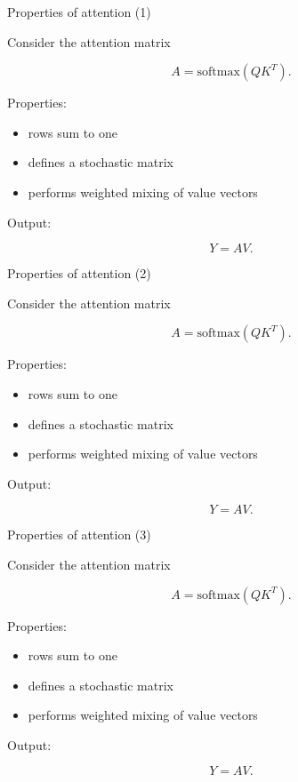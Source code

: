 \documentclass[aspectratio=169]{beamer}
\begin{document}
\begin{frame}{Properties of attention (1)}

Consider the attention matrix

\[
A = \text{softmax}(QK^T).
\]

Properties:

\begin{itemize}
\item rows sum to one
\item defines a stochastic matrix
\item performs weighted mixing of value vectors
\end{itemize}

Output:

\[
Y = AV.
\]

\end{frame}


\begin{frame}{Properties of attention (2)}

Consider the attention matrix

\[
A = \text{softmax}(QK^T).
\]

Properties:

\begin{itemize}
\item rows sum to one
\item defines a stochastic matrix
\item performs weighted mixing of value vectors
\end{itemize}

Output:

\[
Y = AV.
\]

\end{frame}


\begin{frame}{Properties of attention (3)}

Consider the attention matrix

\[
A = \text{softmax}(QK^T).
\]

Properties:

\begin{itemize}
\item rows sum to one
\item defines a stochastic matrix
\item performs weighted mixing of value vectors
\end{itemize}

Output:

\[
Y = AV.
\]

\end{frame}
\end{document}
